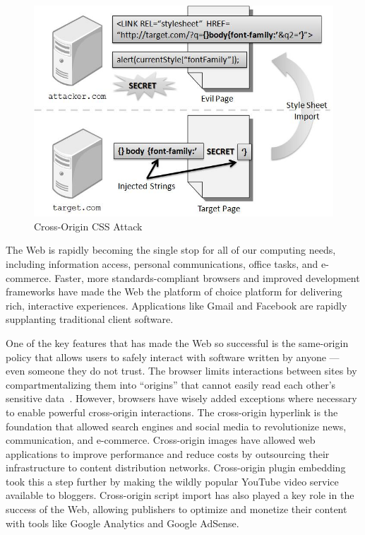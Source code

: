 \documentclass{acm_proc_article-sp}
\begin{document}
\begin{figure}
\centering
\includegraphics[width=\linewidth]{injection.jpg}
\caption{Cross-Origin CSS Attack}
\label{figure:injection}
\end{figure}

The Web is rapidly becoming the single stop for all of our computing needs,
including information access, personal communications, office tasks, and
e-commerce. Faster, more standards-compliant browsers and improved development\linebreak
frameworks have made the Web the platform of choice platform for delivering
rich, interactive experiences. Applications like Gmail and Facebook are
rapidly supplanting traditional client software.

One of the key features that has made the Web so successful is the same-origin
policy that allows users to safely interact with software written by anyone
--- even someone they do not trust. The browser limits interactions between
sites by compartmentalizing them into ``origins'' that cannot easily read each
other's sensitive data~\cite{mozillasameorigin}. However, browsers have wisely
added exceptions where necessary to enable powerful cross-origin interactions.
The cross-origin hyperlink is the foundation that allowed search engines and
social media to revolutionize news, communication, and e-commerce.
Cross-origin images have allowed web applications to improve performance and
reduce costs by outsourcing their infrastructure to content distribution
networks. Cross-origin plugin embedding took this a step further by making the
wildly popular YouTube video service available to bloggers. Cross-origin
script import has also played a key role in the success of the Web, allowing
publishers to optimize and monetize their content with tools like Google
Analytics and Google AdSense.
\end{document}
